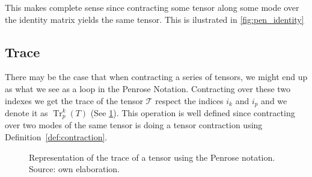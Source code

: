 \documentclass[11pt,a4paper,openright,oneside]{book}
\numberwithin{equation}{section}
\newcommand{\defref}[1]{Definition~\ref{#1}}
\newcommand{\figref}[1]{\cref{#1}}
\DeclareMathOperator{\Tr}{Tr}
\begin{document}
This makes complete sense since contracting some tensor along some mode over the identity matrix yields the same tensor.
This is ilustrated in \figref{fig:pen_identity}


\subsection*{Trace}

There may be the case that when contracting a series of tensors, we might end up as what
we see as a loop in the Penrose Notation. Contracting over these two indexes we get the trace
of the tensor $\mathcal{T}$ respect the indices $i_k$ and $i_p$ and we denote it as $\Tr^k_p(T)$ (See \figref{fig:trace}).
This operation is well defined since contracting over two modes of the same tensor is doing a tensor contraction
using \defref{def:contraction}.

\begin{figure}[h]
\centering

    \begin{minipage}{0.2\textwidth}
\end{minipage}
\begin{minipage}{0.225\textwidth}
\end{minipage}
\begin{minipage}{0.2\textwidth}
\end{minipage}


\caption{
    Representation of the trace of a tensor using the Penrose notation. Source: own elaboration.
}
\label{fig:trace}
\end{figure}
\end{document}
